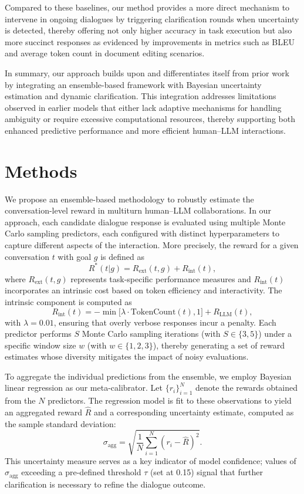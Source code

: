 \documentclass{article} %
\begin{document}
Compared to these baselines, our method provides a more direct mechanism to intervene in ongoing dialogues by triggering clarification rounds when uncertainty is detected, thereby offering not only higher accuracy in task execution but also more succinct responses as evidenced by improvements in metrics such as BLEU and average token count in document editing scenarios.

In summary, our approach builds upon and differentiates itself from prior work by integrating an ensemble-based framework with Bayesian uncertainty estimation and dynamic clarification. This integration addresses limitations observed in earlier models that either lack adaptive mechanisms for handling ambiguity or require excessive computational resources, thereby supporting both enhanced predictive performance and more efficient human–LLM interactions.

\section{Methods}
We propose an ensemble-based methodology to robustly estimate the conversation-level reward in multiturn human–LLM collaborations. In our approach, each candidate dialogue response is evaluated using multiple Monte Carlo sampling predictors, each configured with distinct hyperparameters to capture different aspects of the interaction. More precisely, the reward for a given conversation \( t \) with goal \( g \) is defined as
\[
R^*(t|g) = R_{\text{ext}}(t,g) + R_{\text{int}}(t),
\]
where \( R_{\text{ext}}(t,g) \) represents task-specific performance measures and \( R_{\text{int}}(t) \) incorporates an intrinsic cost based on token efficiency and interactivity. The intrinsic component is computed as
\[
R_{\text{int}}(t) = -\min\bigl[\lambda \cdot \mathrm{TokenCount}(t), 1\bigr] + R_{\text{LLM}}(t),
\]
with \(\lambda = 0.01\), ensuring that overly verbose responses incur a penalty. Each predictor performs \( S \) Monte Carlo sampling iterations (with \( S \in \{3,5\} \)) under a specific window size \( w \) (with \( w \in \{1,2,3\} \)), thereby generating a set of reward estimates whose diversity mitigates the impact of noisy evaluations.

To aggregate the individual predictions from the ensemble, we employ Bayesian linear regression as our meta-calibrator. Let \(\{r_i\}_{i=1}^N\) denote the rewards obtained from the \(N\) predictors. The regression model is fit to these observations to yield an aggregated reward \(\hat{R}\) and a corresponding uncertainty estimate, computed as the sample standard deviation:
\[
\sigma_{\text{agg}} = \sqrt{\frac{1}{N}\sum_{i=1}^N (r_i - \hat{R})^2}.
\]
This uncertainty measure serves as a key indicator of model confidence; values of \(\sigma_{\text{agg}}\) exceeding a pre-defined threshold \(\tau\) (set at 0.15) signal that further clarification is necessary to refine the dialogue outcome.
\end{document}
